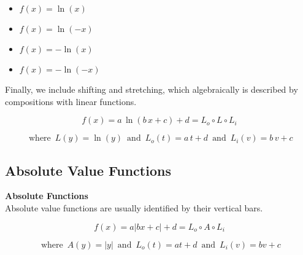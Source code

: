 \documentclass{ximera}
\begin{document}
\begin{template}
\begin{itemize}
\item $f(x) = \ln(x)$ 
\item $f(x) = \ln(-x)$ 
\item $f(x) = -\ln(x)$ 
\item $f(x) = -\ln(-x)$ 
\end{itemize}






Finally, we include shifting and stretching, which algebraically is described by compositions with linear functions.


\[ f(x) = a \, \ln(b \, x + c) + d = L_o \circ L \circ L_i\]

\[
\text{ where } \,   L(y) = \ln(y)   \,  \text{ and } \,    L_o(t) = a \, t + d    \,  \text{ and } \,   L_i(v) = b \, v + c
\]








\end{template}





















\subsection{Absolute Value Functions}








\begin{template}  \textbf{\textcolor{blue!55!black}{Absolute Functions}} \\



Absolute value functions are usually identified by their vertical bars.





\[ f(x) = a | b x + c | + d = L_o \circ A \circ L_i\]

\[
\text{ where } \,  A(y) = | y |  \,  \text{ and } \,    L_o(t) = a t + d    \,  \text{ and } \,   L_i(v) = b v + c
\]







\end{template}
\end{document}
